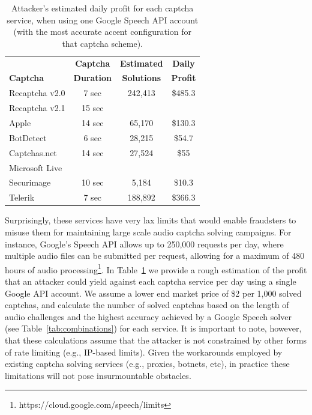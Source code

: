 \begin{table}[t]
\centering
\caption{Attacker's estimated daily profit for each captcha service, when using one Google Speech API account
(with the most accurate accent configuration for that captcha scheme).}
\begin{tabular}{lccc}
\toprule
& \textbf{Captcha} & \textbf{Estimated} & \textbf{Daily} \\
\textbf{Captcha}&  \textbf{Duration} & \textbf{Solutions} & \textbf{Profit} \\
\hline
Recaptcha v2.0 & 7 sec & 242,413 & \$485.3 \\
\rowcolor{Gray}
Recaptcha v2.1 & 15 sec & & \\
Apple  & 14 sec & 65,170 & \$130.3 \\
\rowcolor{Gray}
BotDetect  & 6 sec & 28,215 & \$54.7 \\
Captchas.net & 14 sec & 27,524 & \$55 \\
\rowcolor{Gray}
Microsoft Live & & & \\
Securimage & 10 sec & 5,184 & \$10.3 \\
\rowcolor{Gray}
Telerik & 7 sec & 188,892 & \$366.3 \\
\bottomrule
\end{tabular}
\label{tab:money}
\end{table}

Surprisingly, these services have very lax limits that would enable fraudsters to misuse
them for maintaining large scale audio captcha solving campaigns. For instance, Google's Speech API allows up
to 250,000 requests per day, where multiple audio files can be submitted per request, allowing for a maximum of
480 hours of audio processing\footnote{https://cloud.google.com/speech/limits}. 
In Table~\ref{tab:money} we provide a rough estimation of the profit that an attacker could yield against 
each captcha service per day using a single Google API account. We assume a lower end market price of \$2 
per 1,000 solved captchas, and calculate the number of solved captchas based on the length of audio challenges 
and the highest accuracy achieved by a Google Speech solver (see Table~\ref{tab:combinations}) for each service.
 It is important to note, however, that these calculations assume that the attacker 
is not constrained by other forms of rate limiting (e.g., IP-based limits). Given the workarounds employed
by existing captcha solving services (e.g., proxies, botnets, etc), in practice these limitations will not 
pose insurmountable obstacles.

